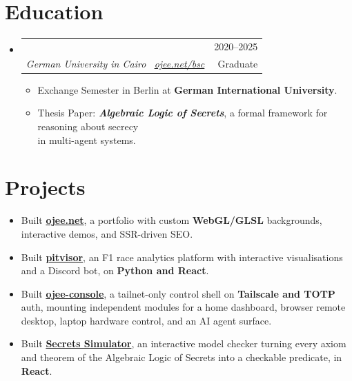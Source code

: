 \documentclass[a4paper,12pt]{article}
\makeatletter
\newcommand{\resumePOR}[3]{
\vspace{0.2mm}\item
    \begin{tabularx}{0.97\textwidth}[t]{@{}L@{\extracolsep{\fill}}r@{}}
        \textbf{#1}\hspace{0.3mm}#2 & {\small{#3}}
    \end{tabularx}
    \vspace{-2.7mm}
}
\newcommand{\resumeSubheading}[4]{
\vspace{0.5mm}\item
    \begin{tabular*}{0.98\textwidth}[t]{l@{\extracolsep{\fill}}r}
        \textbf{#1} & {\footnotesize{#4}} \\
        \textit{\footnotesize{#3}} &  \footnotesize{#2}\\
    \end{tabular*}
    \vspace{-2.4mm}
}
\newcommand{\resumeSubHeadingListStart}{\begin{itemize}[leftmargin=*,labelsep=0mm]}
\newcommand{\resumeItemListStart}{\begin{justify}\begin{itemize}[leftmargin=3ex, rightmargin=2ex, noitemsep,labelsep=1.2mm,itemsep=0mm]}
\newcommand{\resumeSubHeadingListEnd}{\end{itemize}\vspace{1mm}}
\newcommand{\resumeItemListEnd}{\end{itemize}\end{justify}\vspace{-2mm}}
\newcommand{\resumeProjectListStart}{\begin{justify}\begin{itemize}[leftmargin=3ex, rightmargin=2ex, noitemsep, labelsep=1.2mm, itemsep=0mm, label={$\vcenter{\hbox{\tiny$\bullet$}}$}]}
\newcommand{\resumeProjectListEnd}{\end{itemize}\end{justify}\vspace{-2mm}}
\makeatother
\begin{document}
\section{\textbf{Education}}
  \resumeSubHeadingListStart
    \resumeSubheading
      {\makecell[tl]{B.Sc.\ in Media Engineering and Technology, CSEN Major}}{Graduate}
      {German University in Cairo \, \href{https://ojee.net/bsc}{\normalfont ojee.net/bsc}}{2020--2025}
      \vspace{-1.5mm}
      \resumeItemListStart
    \item {Exchange Semester in Berlin at \textbf{German International University}.}
    \item {Thesis Paper: \textbf{\textit{Algebraic Logic of Secrets}}, a formal framework for reasoning about secrecy \\in multi-agent systems.}
    \resumeItemListEnd
  \resumeSubHeadingListEnd
\vspace{-3.5mm}

\section{\textbf{Projects}}
\resumeProjectListStart
\item {Built \href{https://ojee.net}{\textbf{ojee.net}}, a portfolio with custom \textbf{WebGL/GLSL} backgrounds, interactive demos, and SSR-driven SEO.}
\item {Built \href{https://pitvisor.ojee.net}{\textbf{pitvisor}}, an F1 race analytics platform with interactive visualisations and a Discord bot, on \textbf{Python and React}.}
\item {Built \href{https://github.com/0J33/ojee-console}{\textbf{ojee-console}}, a tailnet-only control shell on \textbf{Tailscale and TOTP} auth, mounting independent modules for a home dashboard, browser remote desktop, laptop hardware control, and an AI agent surface.}
\item {Built \href{https://secrets.ojee.net}{\textbf{Secrets Simulator}}, an interactive model checker turning every axiom and theorem of the Algebraic Logic of Secrets into a checkable predicate, in \textbf{React}.}
\resumeProjectListEnd

\end{document}
